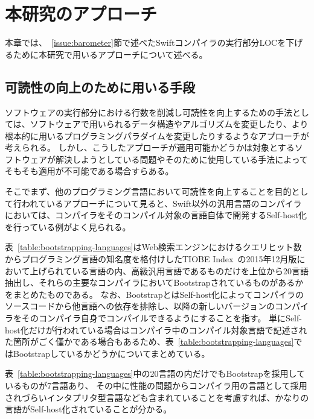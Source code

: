 \chapter{本研究のアプローチ}
\label{approach}

本章では、~\ref{issue:barometer}節で述べたSwiftコンパイラの実行部分LOCを下げるために本研究で用いるアプローチについて述べる。

\section{可読性の向上のために用いる手段}
\label{approach:idea}

ソフトウェアの実行部分における行数を削減し可読性を向上するための手法としては、ソフトウェアで用いられるデータ構造やアルゴリズムを変更したり、より根本的に用いるプログラミングパラダイムを変更したりするようなアプローチが考えられる。
しかし、こうしたアプローチが適用可能かどうかは対象とするソフトウェアが解決しようとしている問題やそのために使用している手法によってそもそも適用が不可能である場合すらある。

そこでまず、他のプログラミング言語において可読性を向上することを目的として行われているアプローチについて見ると、Swift以外の汎用言語のコンパイラにおいては、コンパイラをそのコンパイル対象の言語自体で開発するSelf-host化を行っている例がよく見られる。

表~\ref{table:bootstrapping-languages}はWeb検索エンジンにおけるクエリヒット数からプログラミング言語の知名度を格付けしたTIOBE Index~\cite{tiobe}の2015年12月版において上げられている言語の内、高級汎用言語であるものだけを上位から20言語抽出し、それらの主要なコンパイラにおいてBootstrapされているものがあるかをまとめたものである。
なお、BootstrapとはSelf-host化によってコンパイラのソースコードから他言語への依存を排除し、以降の新しいバージョンのコンパイラをそのコンパイラ自身でコンパイルできるようにすることを指す。
単にSelf-host化だけが行われている場合はコンパイラ中のコンパイル対象言語で記述された箇所がごく僅かである場合もあるため、表~\ref{table:bootstrapping-languages}ではBootstrapしているかどうかについてまとめている。

表~\ref{table:bootstrapping-languages}中の20言語の内だけでもBootstrapを採用しているものが7言語あり、 その中に性能の問題からコンパイラ用の言語として採用されづらいインタプリタ型言語なども含まれていることを考慮すれば、かなりの言語がSelf-host化されていることが分かる。

